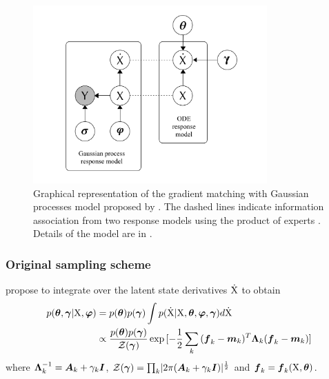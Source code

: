 \begin{figure}
    \centering
    \includegraphics[width=0.8\textwidth]{graphics/gradient-matching-model}
    \caption{Graphical representation of the gradient matching with Gaussian processes model proposed by \cite{calderhead2009accelerating}. The dashed lines indicate information association from two response models using the product of experts  . Details of the model are in .}    
    \label{fig-gmgp-model}
\end{figure}

\subsubsection*{Original sampling scheme}

\cite{calderhead2009accelerating} propose to integrate over the latent state derivatives $\mathrm{\dot{X}}$ to obtain
\begin{align}
    p(\boldsymbol{\theta},\boldsymbol{\gamma}\vert\mathrm{X},\boldsymbol{\varphi}) 
    & =
    p(\boldsymbol{\theta}) p(\boldsymbol{\gamma}) \int{
        p(\mathrm{\dot{X}}\vert\mathrm{X},\boldsymbol{\theta},\boldsymbol{\ensuremath{\varphi}},\boldsymbol{\gamma})d\mathrm{\dot{X}}}
    \nonumber
    \\
    & \propto
    \frac{p(\boldsymbol{\theta}) p(\boldsymbol{\gamma})}{\mathcal{Z}(\boldsymbol{\gamma})} 
    \exp{[
        -\frac{1}{2}\sum_k{
            (\boldsymbol{f}_{k} - \boldsymbol{m}_{k})^T\boldsymbol{\Lambda}_{k}(\boldsymbol{f}_{k} - \boldsymbol{m}_{k})}]}
\end{align}
where $\boldsymbol{\Lambda}_{k}^{-1} = \boldsymbol{A}_{k} + \gamma_{k}\boldsymbol{I}$, $\mathcal{Z}(\boldsymbol{\gamma}) = \prod_k \lvert 2\pi(\boldsymbol{A}_{k} + \gamma_{k}\boldsymbol{I}) \rvert^{\frac{1}{2}}$ and $\boldsymbol{f}_{k} = \boldsymbol{f}_{k}(\mathrm{X}, \boldsymbol{\theta})$.

